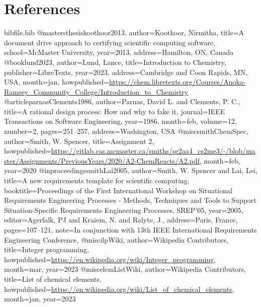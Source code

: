 \documentclass[12pt]{article}
\begin{document}
\section{References}
\label{Sec:References}
\begin{filecontents*}{bibfile.bib}
@mastersthesis{koothoor2013,
author={Koothoor, Nirmitha},
title={A document drive approach to certifying scientific computing software},
school={McMaster University},
year={2013},
address={Hamilton, ON, Canada}}
@book{lund2023,
author={Lund, Lance},
title={Introduction to Chemistry},
publisher={LibreTexts},
year={2023},
address={Cambridge and Coon Rapids, MN, USA},
month=jan,
howpublished={\url{https://chem.libretexts.org/Courses/Anoka-Ramsey\_Community\_College/Introduction\_to\_Chemistry}}}
@article{parnasClements1986,
author={Parnas, David L. and Clements, P. C.},
title={A rational design process: How and why to fake it},
journal={IEEE Transactions on Software Engineering},
year={1986},
month=feb,
volume={12},
number={2},
pages={251--257},
address={Washington, USA}}
@misc{smithChemSpec,
author={Smith, W. Spencer},
title={Assignment 2},
howpublished={\url{https://gitlab.cas.mcmaster.ca/smiths/se2aa4\_cs2me3/-/blob/master/Assignments/PreviousYears/2020/A2-ChemReacts/A2.pdf}},
month=feb,
year={2020}}
@inproceedings{smithLai2005,
author={Smith, W. Spencer and Lai, Lei},
title={A new requirements template for scientific computing},
booktitle={Proceedings of the First International Workshop on Situational Requirements Engineering Processes - Methods, Techniques and Tools to Support Situation-Specific Requirements Engineering Processes, SREP'05},
year={2005},
editor={Agerfalk, PJ and Kraiem, N. and Ralyte, J.},
address={Paris, France},
pages={107--121},
note={In conjunction with 13th IEEE International Requirements Engineering Conference,}}
@misc{ilpWiki,
author={Wikipedia Contributors},
title={Integer programming},
howpublished={\url{https://en.wikipedia.org/wiki/Integer\_programming}},
month=mar,
year={2023}}
@misc{elemListWiki,
author={Wikipedia Contributors},
title={List of chemical elements},
howpublished={\url{https://en.wikipedia.org/wiki/List\_of\_chemical\_elements}},
month=jan,
year={2023}}
\end{filecontents*}
\nocite{*}
\printbibliography[heading=none]
\end{document}
